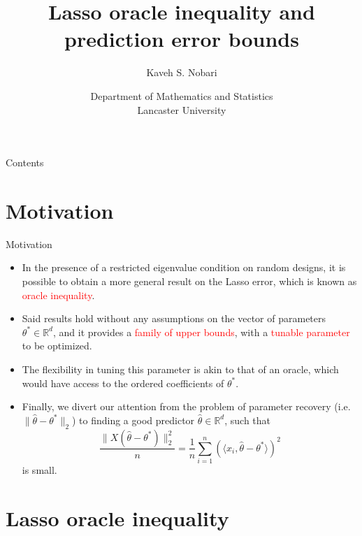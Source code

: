 \documentclass[10pt,handout,english]{beamer}
\title[]{Lasso oracle inequality and prediction error bounds}
\author[Kaveh S. Nobari]{Kaveh S. Nobari}
\institute[]{Lectures in High-Dimensional Statistics}
\date[27/10/2020]
{Department of Mathematics and Statistics\\ Lancaster University}
\newcommand{\R}{\mathbb{R}}
\begin{document}
\begin{frame}
\titlepage
\end{frame}

\begin{frame}{Contents}
\tableofcontents
\end{frame}
\section{Motivation}
\begin{frame}[allowframebreaks]{Motivation}
\begin{itemize}
\item In the presence of a restricted eigenvalue condition on random designs, it is possible to obtain a more general result on the Lasso error, which is known as \textcolor{red}{oracle inequality}.\justifying
\item Said results hold without any assumptions on the vector of parameters $\theta^*\in\R^d$, and it provides a \textcolor{red}{family of upper bounds}, with a \textcolor{red}{tunable parameter} to be optimized. 
\item The flexibility in tuning this parameter is akin to that of an oracle, which would have access to the ordered coefficients of $\theta^*$.
\item Finally, we divert our attention from the problem of parameter recovery (i.e. $\lVert\hat{\theta}-\theta^*\rVert_2$) to finding a good predictor $\hat{\theta}\in\R^d$, such that
\[
\frac{\lVert X(\hat{\theta}-\theta^*)\rVert_2^2}{n}=\frac{1}{n}\sum\limits_{i=1}^{n}\left(\langle x_i,\hat{\theta}-\theta^*\rangle\right)^2
\]
is small.
\end{itemize}  
\end{frame}

\section{Lasso oracle inequality}
\end{document}
